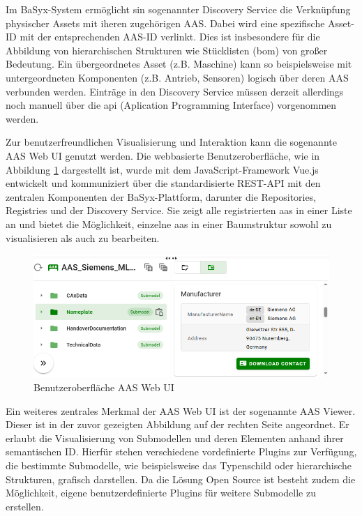 

Im BaSyx-System ermöglicht sin sogenannter Discovery Service die Verknüpfung physischer Assets mit iheren zugehörigen AAS.
Dabei wird eine spezifische Asset-ID mit der entsprechenden AAS-ID verlinkt.
Dies ist insbesondere für die Abbildung von hierarchischen Strukturen wie Stücklisten (\ac{bom}) von großer Bedeutung.
Ein übergeordnetes Asset (z.B. Maschine) kann so beispielsweise mit untergeordneten Komponenten (z.B. Antrieb, Sensoren) logisch über deren AAS verbunden werden.
Einträge in den Discovery Service müssen derzeit allerdings noch manuell über die \acs{api} (Aplication Programming Interface) vorgenommen werden.

Zur benutzerfreundlichen Visualisierung und Interaktion kann die sogenannte AAS Web UI genutzt werden.
Die webbasierte Benutzeroberfläche, wie in Abbildung \ref{fig:BasyxWebUI} dargestellt ist, wurde mit dem JavaScript-Framework Vue.js entwickelt und kommuniziert über die standardisierte REST-API mit den zentralen Komponenten der BaSyx-Plattform, darunter die Repositories, Registries und der Discovery Service.
Sie zeigt alle registrierten \acs{aas} in einer Liste an und bietet die Möglichkeit, einzelne \acs{aas} in einer Baumstruktur sowohl zu visualisieren als auch zu bearbeiten. 

\begin{figure}[htbp]
    \centering
    \includegraphics[width=1\textwidth]{Bilder/BaSyx/Grundlagen.png}
    \caption{Benutzeroberfläche AAS Web UI}
    \label{fig:BasyxWebUI}
\end{figure}

Ein weiteres zentrales Merkmal der AAS Web UI ist der sogenannte AAS Viewer.
Dieser ist in der zuvor gezeigten Abbildung auf der rechten Seite angeordnet.
Er erlaubt die Visualisierung von Submodellen und deren Elementen anhand ihrer semantischen ID. 
Hierfür stehen verschiedene vordefinierte Plugins zur Verfügung, die bestimmte Submodelle, wie beispielsweise das Typenschild oder hierarchische Strukturen, grafisch darstellen.
Da die Lösung Open Source ist besteht zudem die Möglichkeit, eigene benutzerdefinierte Plugins für weitere Submodelle zu erstellen. \cite{BaSyxWiki} \cite{BaSyxEclipse}

